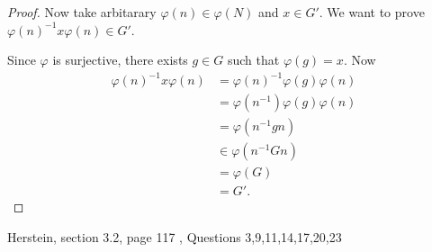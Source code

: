 \begin{enumerate}[resume]
\begin{proof}
	Now take arbitarary $\varphi(n) \in \varphi(N)$ and $x \in G'$. We want to prove $\varphi(n)^{-1} x \varphi(n) \in G'$.

	Since $\varphi$ is surjective, there exists $g \in G$ such that $\varphi(g) = x$. Now
	\begin{align*}
		\varphi(n)^{-1} x \varphi(n) 
		&= \varphi(n)^{-1} \varphi(g) \varphi(n) \\
		&= \varphi(n^{-1} ) \varphi(g) \varphi(n) \\
		&= \varphi(n^{-1} gn)\\
		&\in \varphi(n^{-1} Gn)\\
		&= \varphi(G)\\
		&= G'
	.\end{align*}
\end{proof}

\end{enumerate}
\newpage
Herstein, section 3.2, page 117 , Questions 3,9,11,14,17,20,23
